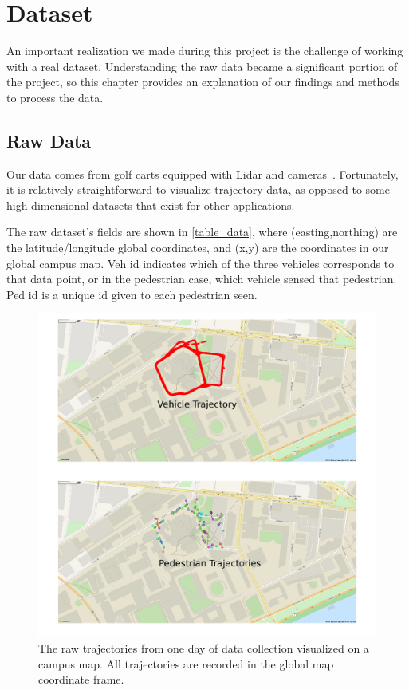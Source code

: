 
\section{Dataset} \label{sec:dataset}


An important realization we made during this project is the challenge of working with a real dataset.
Understanding the raw data became a significant portion of the project, so this chapter provides an explanation of our findings and methods to process the data.

\subsection{Raw Data}

Our data comes from golf carts equipped with Lidar and cameras~\cite{Miller16_IROS,Miller17_predictive_ICRA}.
Fortunately, it is relatively straightforward to visualize trajectory data, as opposed to some high-dimensional datasets that exist for other applications. 

The raw dataset's fields are shown in \cref{table_data}, where (easting,northing) are the latitude/longitude global coordinates, and (x,y) are the coordinates in our global campus map.
Veh id indicates which of the three vehicles corresponds to that data point, or in the pedestrian case, which vehicle sensed that pedestrian.
Ped id is a unique id given to each pedestrian seen.

\begin{figure}
	\centering
	\includegraphics [trim=0 0 0 0, clip, angle=0, width=0.8\columnwidth,
	keepaspectratio]{figures/traj_on_map}
	\caption{The raw trajectories from one day of data collection visualized on a campus map. All trajectories are recorded in the global map coordinate frame.} 
	\label{fig:traj_on_map} 
\end{figure}


